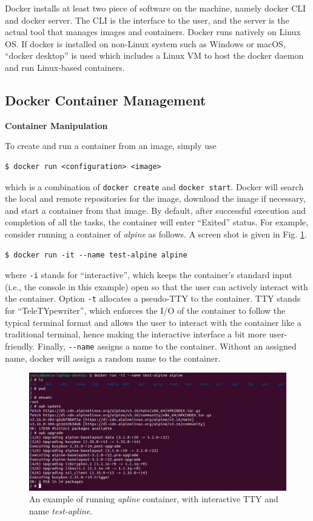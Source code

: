 Docker installs at least two piece of software on the machine, namely docker CLI and docker server. The CLI is the interface to the user, and the server is the actual tool that manages images and containers. Docker runs natively on Linux OS. If docker is installed on non-Linux system such as Windows or macOS, ``docker desktop'' is used which includes a Linux VM to host the docker daemon and run Linux-based containers.

\subsection{Docker Container Management}

\vspace{0.1in}
\noindent \textbf{Container Manipulation}
\vspace{0.1in}

To create and run a container from an image, simply use
\begin{lstlisting}
$ docker run <configuration> <image>
\end{lstlisting}
which is a combination of \verb|docker create| and \verb|docker start|. Docker will search the local and remote repositories for the image, download the image if necessary, and start a container from that image. By default, after successful execution and completion of all the tasks, the container will enter ``Exited'' status. For example, consider running a container of \textit{alpine} as follows. A screen shot is given in Fig. \ref{ch:vac:fig:dockerrunexp}.
\begin{lstlisting}
$ docker run -it --name test-alpine alpine
\end{lstlisting}
where \verb|-i| stands for ``interactive'', which keeps the container's standard input (i.e., the console in this example) open so that the user can actively interact with the container. Option \verb|-t| allocates a pseudo-TTY to the container. TTY stands for ``TeleTYpewriter'', which enforces the I/O of the container to follow the typical terminal format and allows the user to interact with the container like a traditional terminal, hence making the interactive interface a bit more user-friendly. Finally, \verb|--name| assigns a name to the container. Without an assigned name, docker will assign a random name to the container.
\begin{figure}[htbp]
	\centering
	\includegraphics[width=350pt]{chapters/part-3/figures/dockerrunexp.png}
	\caption{An example of running \textit{apline} container, with interactive TTY and name \textit{test-apline}.} \label{ch:vac:fig:dockerrunexp}
\end{figure}

